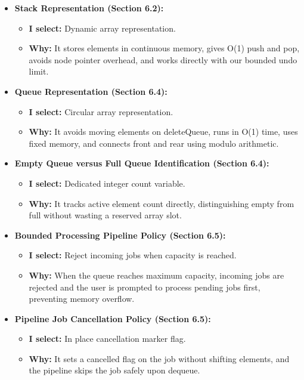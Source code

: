 \documentclass[10pt,a4paper]{article}
\begin{document}
\begin{itemize}[noitemsep,topsep=2pt,parsep=1pt,partopsep=0pt]
    \item \textbf{Stack Representation (Section 6.2):}
    \begin{itemize}[noitemsep,topsep=1pt,parsep=0pt]
        \item \textbf{I select:} Dynamic array representation.
        \item \textbf{Why:} It stores elements in continuous memory, gives O(1) push and pop, avoids node pointer overhead, and works directly with our bounded undo limit.
    \end{itemize}

    \item \textbf{Queue Representation (Section 6.4):}
    \begin{itemize}[noitemsep,topsep=1pt,parsep=0pt]
        \item \textbf{I select:} Circular array representation.
        \item \textbf{Why:} It avoids moving elements on deleteQueue, runs in O(1) time, uses fixed memory, and connects front and rear using modulo arithmetic.
    \end{itemize}

    \item \textbf{Empty Queue versus Full Queue Identification (Section 6.4):}
    \begin{itemize}[noitemsep,topsep=1pt,parsep=0pt]
        \item \textbf{I select:} Dedicated integer count variable.
        \item \textbf{Why:} It tracks active element count directly, distinguishing empty from full without wasting a reserved array slot.
    \end{itemize}

    \item \textbf{Bounded Processing Pipeline Policy (Section 6.5):}
    \begin{itemize}[noitemsep,topsep=1pt,parsep=0pt]
        \item \textbf{I select:} Reject incoming jobs when capacity is reached.
        \item \textbf{Why:} When the queue reaches maximum capacity, incoming jobs are rejected and the user is prompted to process pending jobs first, preventing memory overflow.
    \end{itemize}

    \item \textbf{Pipeline Job Cancellation Policy (Section 6.5):}
    \begin{itemize}[noitemsep,topsep=1pt,parsep=0pt]
        \item \textbf{I select:} In place cancellation marker flag.
        \item \textbf{Why:} It sets a cancelled flag on the job without shifting elements, and the pipeline skips the job safely upon dequeue.
    \end{itemize}


\end{itemize}
\end{document}
